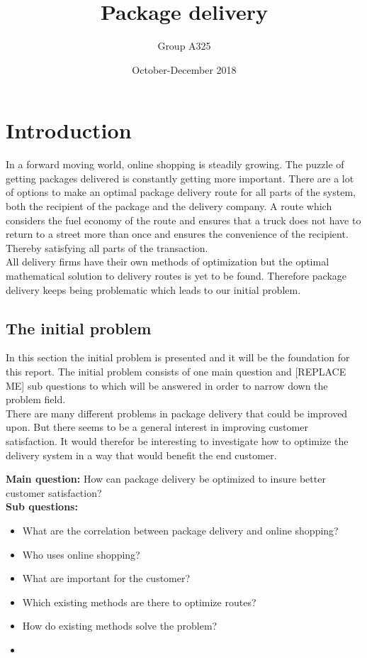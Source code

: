 \documentclass[12pt]{report}
\title{Package delivery}
\author{Group A325}
\date{October-December 2018}
\begin{document}
\maketitle

\tableofcontents




\chapter{Introduction}
In a forward moving world, online shopping is steadily growing. The puzzle of getting packages delivered is constantly getting more important. There are a lot of options to make an optimal package delivery route for all parts of the system, both the recipient of the package and the delivery company. A route which considers the fuel economy of the route and ensures that a truck does not have to return to a street more than once and ensures the convenience of the recipient. Thereby satisfying all parts of the transaction. \\\hspace*{5 mm}
All delivery firms have their own methods of optimization but the optimal mathematical solution to delivery routes is yet to be found\cite{notsolved}. Therefore package delivery keeps being problematic which leads to our initial problem.


\section{The initial problem}
In this section the initial problem is presented and it will be the foundation for this report. The initial problem consists of one main question and [REPLACE ME] sub questions to which will be answered in order to narrow down the problem field. \\

There are many different problems in package delivery that could be improved upon. But there seems to be a general interest in improving customer satisfaction. It would therefor be interesting to investigate how to optimize the delivery system in a way that would benefit the end customer.

\textbf{Main question:} How can package delivery be optimized to insure better customer satisfaction? \\

\textbf{Sub questions:} \\
\begin{itemize}
\item What are the correlation between package delivery and online shopping?
\item Who uses online shopping?
\item What are important for the customer?
\item Which existing methods are there to optimize routes?

\item How do existing methods solve the problem?
\item 
\end{itemize}
\end{document}
